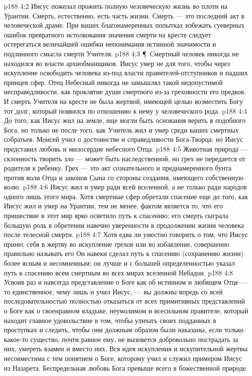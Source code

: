 \vs p188 4:2 Иисус пожелал прожить полную человеческую жизнь во плоти на Урантии. Смерть, естественно, есть часть жизни. Смерть --- это последний акт в человеческой драме. При ваших благонамеренных попытках избежать суеверных ошибок превратного истолкования значения смерти на кресте следует остерегаться величайшей ошибки непонимания истинной значимости и подлинного смысла смерти Учителя.
\vs p188 4:3 \P\ Смертный человек никогда не находился во власти архиобманщиков. Иисус умер не для того, чтобы через искупление освободить человека из\hyp{}под власти правителей\hyp{}отступников и падших принцев сфер. Отец Небесный никогда не замышлял такой недопустимой несправедливости, как проклятие души смертного из\hyp{}за греховности его предков. И смерть Учителя на кресте не была жертвой, имеющей целью возместить Богу тот долг, который появился по отношению к нему у человеческого рода.
\vs p188 4:4 До того, как Иисус жил на земле, еще могли быть основания верить в подобного Бога, но только не после того, как Учитель жил и умер среди ваших смертных собратьев. Моисей учил о достоинстве и справедливости Бога\hyp{}Творца; но Иисус представил любовь и милосердие небесного Отца.
\vs p188 4:5 Животная природа --- склонность творить зло --- может быть наследственной, но грех не передается от родителя к ребенку. Грех --- это акт сознательного и преднамеренного бунта против воли Отца и законов Сына со стороны создания, имеющего собственную волю.
\vs p188 4:6 Иисус жил и умер ради всей вселенной, а не только ради народов одного лишь этого мира. Хотя смертные сфер обретали спасение еще до того, как Иисус жил и умер на Урантии, тем не менее, фактом является то, что его пришествие в этот мир ярко осветило путь к спасению; его смерть сыграла большую роль в обретении навечно уверенности в продолжении жизни человека после телесной смерти.
\vs p188 4:7 Хотя едва ли уместно говорить о том, что Иисус принес себя в жертву во искупление грехов или во избавление, совершенно правильно называть его  Он навеки сделал путь к спасению (сохранению жизни) более ясным и несомненным; он лучше и с большей определенностью указал путь к спасению всем смертным во всех мирах вселенной Небадон.
\vs p188 4:8 Усвоив раз и навсегда представление о Боге как об истинном и любящем Отце --- то единственное, чему лишь и учил Иисус, --- вы должны впредь со всей последовательностью полностью отказаться от всех примитивных представлений о Боге как о своенравном владыке, неумолимом и всесильном правителе, который находит главное удовольствие в том, чтобы уличать своих подданных в проступках и следить, чтобы они должным образом были наказаны, если только какое\hyp{}то существо, почти равное ему, не вызовется добровольно пострадать за них, умереть взамен и вместо них. Вся идея искупления и искупительной жертвы несовместима с тем понятием о Боге, которому учил и служил примером Иисус из Назарета. Беспредельная любовь Бога превыше всего в божественной природе.

